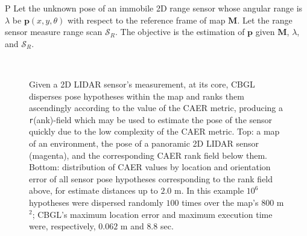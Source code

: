\begin{customprb}{P}
  \label{prob:the_problem}
  Let the unknown pose of an immobile 2D range sensor whose angular range is
  $\lambda$ be $\bm{p}(x,y,\theta)$ with respect to the reference frame of map
  $\bm{M}$. Let the range sensor measure range scan $\mathcal{S}_R$. The
  objective is the estimation of $\bm{p}$ given $\bm{M}$, $\lambda$, and
  $\mathcal{S}_R$.
\end{customprb}

\begin{figure}\vspace{0.4em}
  \subfloat{    \label{fig:a}} \vspace{-1.7cm}\\
  \subfloat{\hspace{-0.3cm} \label{fig:b}}
  \caption{\small
           Given a 2D LIDAR sensor's measurement, at its core, CBGL disperses
           pose hypotheses within the map and ranks them ascendingly according
           to the value of the CAER metric, producing a \texttt{r}(ank)-field
           which may be used to estimate the pose of the sensor quickly due to
           the low complexity of the CAER metric.
           Top: a map of an environment, the pose of a panoramic 2D LIDAR sensor
           (magenta), and the corresponding CAER rank field below them.
           Bottom: distribution of CAER values by location and orientation
           error of all sensor pose hypotheses corresponding to the rank field
           above, for estimate distances up to $2.0$ m.
           In this example $10^6$ hypotheses were dispersed randomly $100$ times
           over the map's $800$ m$^2$; CBGL's maximum location error and maximum
           execution time were, respectively, $0.062$ m and $8.8$ sec.
           }
  \vspace{-0.75cm}
  \label{fig:AB}
\end{figure}
